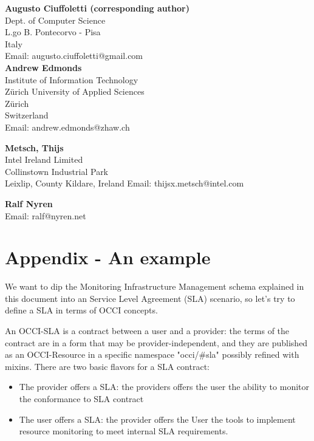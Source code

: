 \documentclass[12pt]{article}  %
\begin{document}
{\textbf{Augusto Ciuffoletti (corresponding author)} \\
Dept. of Computer Science \\
L.go B. Pontecorvo - Pisa\\
Italy \\
Email: augusto.ciuffoletti@gmail.com \\

\textbf{Andrew Edmonds}\\
Institute of Information Technology \\
Zürich University of Applied Sciences \\
Zürich \\
Switzerland \\
Email: andrew.edmonds@zhaw.ch

\textbf{Metsch, Thijs} \\
Intel Ireland Limited \\
Collinstown Industrial Park \\
Leixlip, County Kildare, Ireland
Email: thijsx.metsch@intel.com

\textbf{Ralf Nyren} \\
Email: ralf@nyren.net 



\appendix

\section*{Appendix - An example}

We want to dip the Monitoring Infrastructure Management schema explained in this document into an Service Level Agreement (SLA) scenario, so let's try to define a SLA in terms of OCCI concepts.

An OCCI-SLA is a contract between a user and a provider: the terms of the contract are in a form that may be provider-independent, and they are published as an OCCI-Resource in a specific namespace "occi/\#sla" possibly refined with mixins. There are two basic flavors for a SLA contract:

\begin{itemize} 
\item The provider offers a SLA: the providers offers the user the ability to monitor the conformance to SLA contract
\item The user offers a SLA: the provider offers the User the tools to implement resource monitoring to meet internal SLA requirements.
\end{itemize}

}
\end{document}
